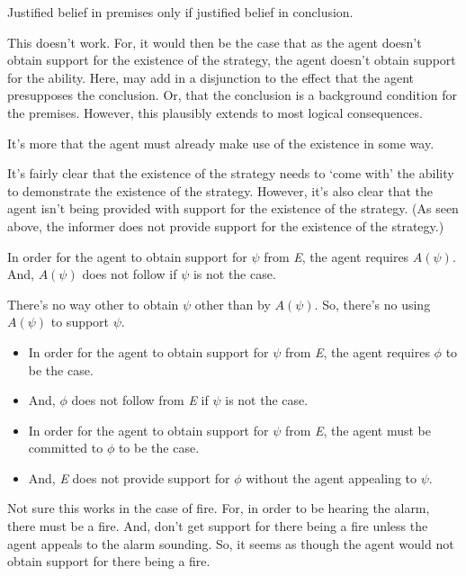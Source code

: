 \documentclass[10pt]{article}
\begin{document}
\begin{note}[Sgaravatti]
  Justified belief in premises only if justified belief in conclusion.

  This doesn't work.
  For, it would then be the case that as the agent doesn't obtain support for the existence of the strategy, the agent doesn't obtain support for the ability.
  Here, may add in a disjunction to the effect that the agent presupposes the conclusion.
  Or, that the conclusion is a background condition for the premises.
  However, this plausibly extends to most logical consequences.

  It's more that the agent must already make use of the existence in some way.
\end{note}

\begin{note}
  It's fairly clear that the existence of the strategy needs to `come with' the ability to demonstrate the existence of the strategy.
  However, it's also clear that the agent isn't being provided with support for the existence of the strategy.
  (As seen above, the informer does not provide support for the existence of the strategy.)

  In order for the agent to obtain support for \(\psi\) from \emph{E}, the agent requires \(A(\psi)\).
  And, \(A(\psi)\) does not follow if \(\psi\) is not the case.

  There's no way other to obtain \(\psi\) other than by \(A(\psi)\).
  So, there's no using \(A(\psi)\) to support \(\psi\).

  \begin{itemize}
  \item In order for the agent to obtain support for \(\psi\) from \emph{E}, the agent requires \(\phi\) to be the case.
  \item And, \(\phi\) does not follow from \emph{E} if \(\psi\) is not the case.
  \end{itemize}

  \begin{itemize}
  \item In order for the agent to obtain support for \(\psi\) from \emph{E}, the agent must be committed to \(\phi\) to be the case.
  \item And, \emph{E} does not provide support for \(\phi\) without the agent appealing to \(\psi\).
  \end{itemize}

  Not sure this works in the case of fire.
  For, in order to be hearing the alarm, there must be a fire.
  And, don't get support for there being a fire unless the agent appeals to the alarm sounding.
  So, it seems as though the agent would not obtain support for there being a fire.


\end{note}
\end{document}
